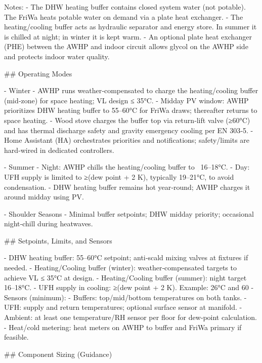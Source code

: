 \documentclass[11pt,oneside]{report}
\begin{document}
\begin{markdown}

Notes:
- The DHW heating buffer contains closed system water (not potable). The FriWa heats potable water on demand via a plate heat exchanger.
- The heating/cooling buffer acts as hydraulic separator and energy store. In summer it is chilled at night; in winter it is kept warm.
- An optional plate heat exchanger (PHE) between the AWHP and indoor circuit allows glycol on the AWHP side and protects indoor water quality.

## Operating Modes

- Winter
  - AWHP runs weather‑compensated to charge the heating/cooling buffer (mid‑zone) for space heating; VL design ≤ 35°C.
  - Midday PV window: AWHP prioritizes DHW heating buffer to 55–60°C for FriWa draws; thereafter returns to space heating.
  - Wood stove charges the buffer top via return‑lift valve (≥60°C) and has thermal discharge safety and gravity emergency cooling per EN 303‑5.
  - Home Assistant (HA) orchestrates priorities and notifications; safety/limits are hard‑wired in dedicated controllers.

- Summer
  - Night: AWHP chills the heating/cooling buffer to ~16–18°C.
  - Day: UFH supply is limited to ≥(dew point + 2 K), typically 19–21°C, to avoid condensation.
  - DHW heating buffer remains hot year‑round; AWHP charges it around midday using PV.

- Shoulder Seasons
  - Minimal buffer setpoints; DHW midday priority; occasional night‑chill during heatwaves.

## Setpoints, Limits, and Sensors

- DHW heating buffer: 55–60°C setpoint; anti‑scald mixing valves at fixtures if needed.
- Heating/Cooling buffer (winter): weather‑compensated targets to achieve VL ≤ 35°C at design.
- Heating/Cooling buffer (summer): night target 16–18°C.
- UFH supply in cooling: ≥(dew point + 2 K). Example: 26°C and 60%
- Sensors (minimum):
  - Buffers: top/mid/bottom temperatures on both tanks.
  - UFH: supply and return temperatures; optional surface sensor at manifold.
  - Ambient: at least one temperature/RH sensor per floor for dew‑point calculation.
  - Heat/cold metering: heat meters on AWHP to buffer and FriWa primary if feasible.

## Component Sizing (Guidance)


\end{markdown}
\end{document}
